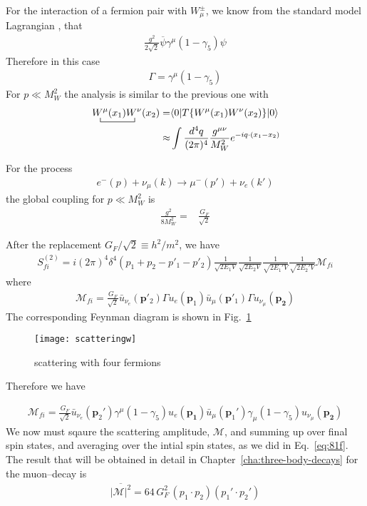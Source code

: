 For the interaction of a fermion pair with $W_\mu^\pm$, we know from
the standard model Lagrangian \cite{lsm}, that
\begin{align}
  \frac{g^2}{2\sqrt{2}}\overline{\psi}\gamma^\mu(1-\gamma_5)\psi
\end{align}
Therefore in this case
\begin{align}
  \Gamma=\gamma^\mu(1-\gamma_5)
\end{align}
For $p\ll M_W^2$ the analysis is similar to the previous one with
\begin{align}
   \bcontraction{\,}{W^\mu}{(x_1)}{W^\nu}
\,W^\mu(x_1)W^\nu(x_2)=&\langle0|T\{W^\mu(x_1)W^\nu(x_2)\}|0\rangle\nonumber\\
\approx&\int\frac{d^4q}{(2\pi)^4}\frac{g^{\mu\nu}}{M_W^2}e^{-i q\cdot(x_1-x_2)}
\end{align}

For the process 
\begin{align}
  e^-(p)+\nu_\mu(k)\to\mu^-(p')+\nu_e(k')
\end{align}
the global coupling for $p\ll M_W^2$ is
\begin{align}
  \frac{g^2}{8M_W^2}=&\frac{G_F}{\sqrt{2}}
\end{align}

After the replacement $G_F/\sqrt{2}\equiv h^2/m^2$, we have
\begin{align}
  \label{eq:101f}
  S^{(2)}_{fi}=i(2\pi)^4\delta^{4}\left(p_1+p_2-p'_1-p'_2\right)
  \frac{1}{\sqrt{2E_1 V}}\frac{1}{\sqrt{2E_2 V}}
  \frac{1}{\sqrt{2E_1' V}}\frac{1}{\sqrt{2E_2' V}}
  \mathcal{M}_{fi}
\end{align}
where
\begin{align}
  \mathcal{M}_{fi}=\frac{G_F}{\sqrt{2}}
\bar{u}_{\nu_e}(\mathbf{p}'_2)\Gamma u_e(\mathbf{p}_1)\bar{u}_\mu(\mathbf{p}'_1)\Gamma u_{\nu_\mu}(\mathbf{p_2})
\end{align}
The corresponding Feynman diagram is shown in Fig.~\ref{fig:sw}
\begin{figure} %
  \centering %
  \texttt{[image: scatteringw]} %
  \caption{scattering with four fermions} %
  \label{fig:sw} %
\end{figure} %
Therefore we have

\begin{align}
  \mathcal{M}_{fi}=\frac{G_F}{\sqrt{2}}
\bar{u}_{\nu_e}(\mathbf{p}_2')\gamma^\mu(1-\gamma_5)u_e(\mathbf{p_1})
\bar{u}_\mu(\mathbf{p}_1')\gamma_\mu(1-\gamma_5)u_{\nu_\mu}(\mathbf{p_2})
\end{align}
We now must sqaure the scattering amplitude, $\mathcal{M}$, and summing up over final spin states, and averaging over the intial spin states, as we did in Eq.~\eqref{eq:81f}. The result that will be obtained in detail in Chapter~\ref{cha:three-body-decays} for the muon--decay is
\begin{align}
  \label{eq:102f}
  \overline{|\mathcal{M}|^2}=64\,G_F^2\,(p_1\cdot p_2)(p_1'\cdot p_2')
\end{align}

